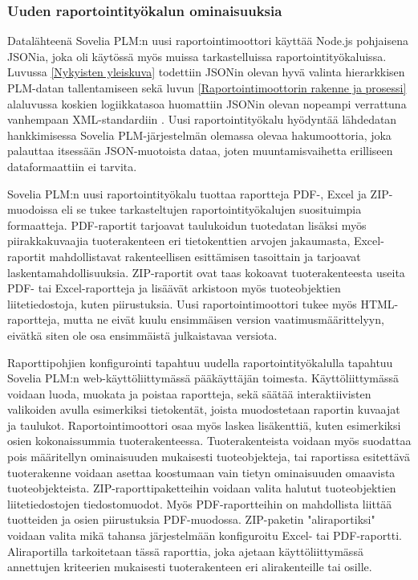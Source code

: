 \subsubsection{Uuden raportointityökalun ominaisuuksia}

Datalähteenä Sovelia PLM:n uusi raportointimoottori käyttää Node.js pohjaisena JSONia, joka oli käytössä myös muissa tarkastelluissa raportointityökaluissa. Luvussa \ref{Nykyisten yleiskuva} todettiin JSONin olevan hyvä valinta hierarkkisen PLM-datan tallentamiseen sekä luvun \ref{Raportointimoottorin rakenne ja prosessi} alaluvussa koskien logiikkatasoa huomattiin JSONin olevan nopeampi verrattuna vanhempaan XML-standardiin \cite{nurseitov_comparison_nodate}. Uusi raportointityökalu hyödyntää lähdedatan hankkimisessa Sovelia PLM-järjestelmän olemassa olevaa hakumoottoria, joka palauttaa itsessään JSON-muotoista dataa, joten muuntamisvaihetta erilliseen dataformaattiin ei tarvita.


Sovelia PLM:n uusi raportointityökalu tuottaa raportteja PDF-, Excel ja ZIP-muodoissa eli se tukee tarkasteltujen raportointityökalujen suosituimpia formaatteja. PDF-raportit tarjoavat taulukoidun tuotedatan lisäksi myös piirakkakuvaajia tuoterakenteen eri tietokenttien arvojen jakaumasta, Excel-raportit mahdollistavat rakenteellisen esittämisen tasoittain ja tarjoavat laskentamahdollisuuksia. ZIP-raportit ovat taas kokoavat tuoterakenteesta useita PDF- tai Excel-raportteja ja lisäävät arkistoon myös tuoteobjektien liitetiedostoja, kuten piirustuksia. Uusi raportointimoottori tukee myös HTML-raportteja, mutta ne eivät kuulu ensimmäisen version vaatimusmäärittelyyn, eivätkä siten ole osa ensimmäistä julkaistavaa versiota.


Raporttipohjien konfigurointi tapahtuu uudella raportointityökalulla tapahtuu Sovelia PLM:n web-käyttöliittymässä pääkäyttäjän toimesta. Käyttöliittymässä voidaan luoda, muokata ja poistaa raportteja, sekä säätää interaktiivisten valikoiden avulla esimerkiksi tietokentät, joista muodostetaan raportin kuvaajat ja taulukot. Raportointimoottori osaa myös laskea lisäkenttiä, kuten esimerkiksi osien kokonaissummia tuoterakenteessa. Tuoterakenteista voidaan myös suodattaa pois määritellyn ominaisuuden mukaisesti tuoteobjekteja, tai raportissa esitettävä tuoterakenne voidaan asettaa koostumaan vain tietyn ominaisuuden omaavista tuoteobjekteista. ZIP-raporttipaketteihin voidaan valita halutut tuoteobjektien liitetiedostojen tiedostomuodot. Myös PDF-raportteihin on mahdollista liittää tuotteiden ja osien piirustuksia PDF-muodossa. ZIP-paketin "aliraportiksi" voidaan valita mikä tahansa järjestelmään konfiguroitu Excel- tai PDF-raportti. Aliraportilla tarkoitetaan tässä raporttia, joka ajetaan käyttöliittymässä annettujen kriteerien mukaisesti tuoterakenteen eri alirakenteille tai osille.

